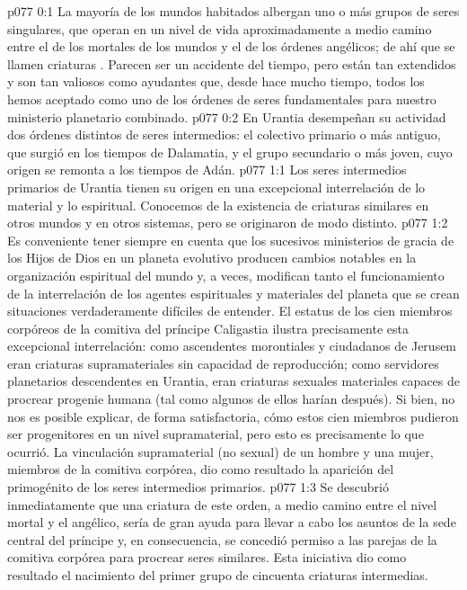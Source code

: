 \author{Arcángel}
\vs p077 0:1 La mayoría de los mundos habitados albergan uno o más grupos de seres singulares, que operan en un nivel de vida aproximadamente a medio camino entre el de los mortales de los mundos y el de los órdenes angélicos; de ahí que se llamen criaturas . Parecen ser un accidente del tiempo, pero están tan extendidos y son tan valiosos como ayudantes que, desde hace mucho tiempo, todos los hemos aceptado como uno de los órdenes de seres fundamentales para nuestro ministerio planetario combinado.
\vs p077 0:2 En Urantia desempeñan su actividad dos órdenes distintos de seres intermedios: el colectivo primario o más antiguo, que surgió en los tiempos de Dalamatia, y el grupo secundario o más joven, cuyo origen se remonta a los tiempos de Adán.
\vs p077 1:1 Los seres intermedios primarios de Urantia tienen su origen en una excepcional interrelación de lo material y lo espiritual. Conocemos de la existencia de criaturas similares en otros mundos y en otros sistemas, pero se originaron de modo distinto.
\vs p077 1:2 Es conveniente tener siempre en cuenta que los sucesivos ministerios de gracia de los Hijos de Dios en un planeta evolutivo producen cambios notables en la organización espiritual del mundo y, a veces, modifican tanto el funcionamiento de la interrelación de los agentes espirituales y materiales del planeta que se crean situaciones verdaderamente difíciles de entender. El estatus de los cien miembros corpóreos de la comitiva del príncipe Caligastia ilustra precisamente esta excepcional interrelación: como ascendentes morontiales y ciudadanos de Jerusem eran criaturas supramateriales sin capacidad de reproducción; como servidores planetarios descendentes en Urantia, eran criaturas sexuales materiales capaces de procrear progenie humana (tal como algunos de ellos harían después). Si bien, no nos es posible explicar, de forma satisfactoria, cómo estos cien miembros pudieron ser progenitores en un nivel supramaterial, pero esto es precisamente lo que ocurrió. La vinculación supramaterial (no sexual) de un hombre y una mujer, miembros de la comitiva corpórea, dio como resultado la aparición del primogénito de los seres intermedios primarios.
\vs p077 1:3 Se descubrió inmediatamente que una criatura de este orden, a medio camino entre el nivel mortal y el angélico, sería de gran ayuda para llevar a cabo los asuntos de la sede central del príncipe y, en consecuencia, se concedió permiso a las parejas de la comitiva corpórea para procrear seres similares. Esta iniciativa dio como resultado el nacimiento del primer grupo de cincuenta criaturas intermedias.
